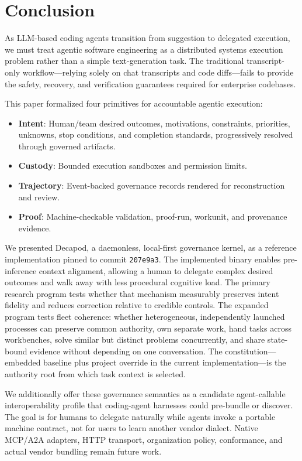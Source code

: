 \section{Conclusion}
\label{sec:conclusion}

As LLM-based coding agents transition from suggestion to delegated execution, we must treat agentic software engineering as a distributed systems execution problem rather than a simple text-generation task. The traditional transcript-only workflow—relying solely on chat transcripts and code diffs—fails to provide the safety, recovery, and verification guarantees required for enterprise codebases.

This paper formalized four primitives for accountable agentic execution:
\begin{itemize}
    \item \textbf{Intent}: Human/team desired outcomes, motivations, constraints, priorities, unknowns, stop conditions, and completion standards, progressively resolved through governed artifacts.
    \item \textbf{Custody}: Bounded execution sandboxes and permission limits.
    \item \textbf{Trajectory}: Event-backed governance records rendered for reconstruction and review.
    \item \textbf{Proof}: Machine-checkable validation, proof-run, workunit, and provenance evidence.
\end{itemize}

We presented Decapod, a daemonless, local-first governance kernel, as a reference implementation pinned to commit \texttt{207e9a3}. The implemented binary enables pre-inference context alignment, allowing a human to delegate complex desired outcomes and walk away with less procedural cognitive load. The primary research program tests whether that mechanism measurably preserves intent fidelity and reduces correction relative to credible controls. The expanded program tests fleet coherence: whether heterogeneous, independently launched processes can preserve common authority, own separate work, hand tasks across workbenches, solve similar but distinct problems concurrently, and share state-bound evidence without depending on one conversation. The constitution---embedded baseline plus project override in the current implementation---is the authority root from which task context is selected.

We additionally offer these governance semantics as a candidate agent-callable interoperability profile that coding-agent harnesses could pre-bundle or discover. The goal is for humans to delegate naturally while agents invoke a portable machine contract, not for users to learn another vendor dialect. Native MCP/A2A adapters, HTTP transport, organization policy, conformance, and actual vendor bundling remain future work.

